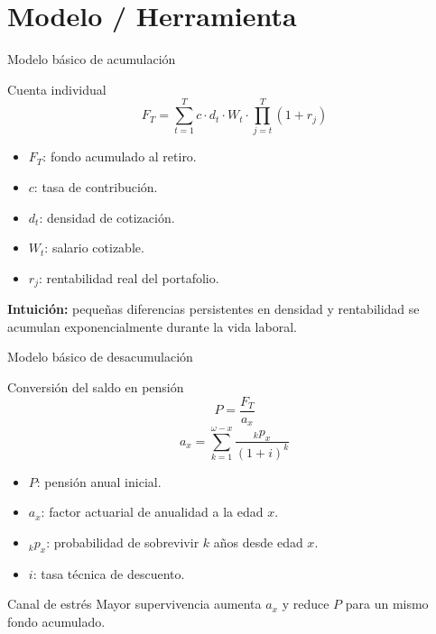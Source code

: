 \documentclass[aspectratio=169,11pt]{beamer}
\begin{document}
\section{Modelo / Herramienta}

\begin{frame}{Modelo básico de acumulación}
\begin{block}{Cuenta individual}
\[
F_T = \sum_{t=1}^{T} c \cdot d_t \cdot W_t \cdot \prod_{j=t}^{T}(1+r_j)
\]
\end{block}

\begin{itemize}
  \item $F_T$: fondo acumulado al retiro.
  \item $c$: tasa de contribución.
  \item $d_t$: densidad de cotización.
  \item $W_t$: salario cotizable.
  \item $r_j$: rentabilidad real del portafolio.
\end{itemize}

\vspace{0.2cm}
\textbf{Intuición:} pequeñas diferencias persistentes en densidad y rentabilidad se acumulan exponencialmente durante la vida laboral.
\end{frame}

\begin{frame}{Modelo básico de desacumulación}
\begin{block}{Conversión del saldo en pensión}
\[
P = \frac{F_T}{a_x}
\]
\[
a_x = \sum_{k=1}^{\omega-x} \frac{{}_{k}p_x}{(1+i)^k}
\]
\end{block}

\begin{itemize}
  \item $P$: pensión anual inicial.
  \item $a_x$: factor actuarial de anualidad a la edad $x$.
  \item ${}_{k}p_x$: probabilidad de sobrevivir $k$ años desde edad $x$.
  \item $i$: tasa técnica de descuento.
\end{itemize}

\begin{alertblock}{Canal de estrés}
Mayor supervivencia aumenta $a_x$ y reduce $P$ para un mismo fondo acumulado.
\end{alertblock}
\end{frame}
\end{document}
